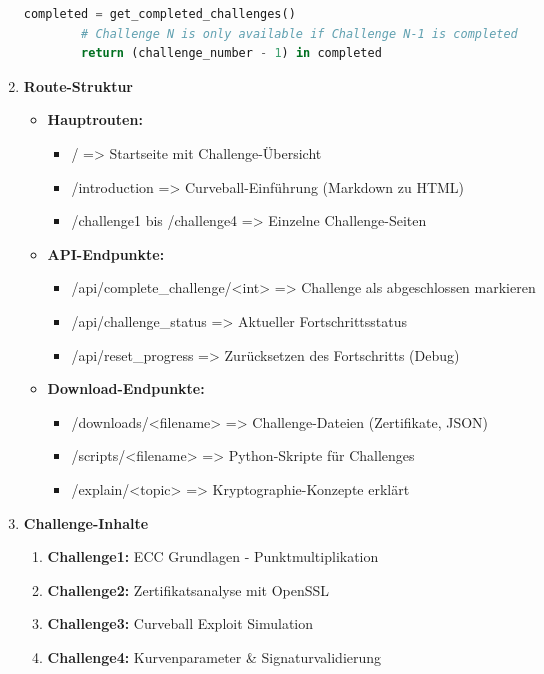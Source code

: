 \documentclass{article}
\begin{document}
\begin{enumerate}
\begin{lstlisting}[language=Python,caption={Challenge-Lock}]
        completed = get_completed_challenges()
        # Challenge N is only available if Challenge N-1 is completed
        return (challenge_number - 1) in completed
    \end{lstlisting}
    \item \textbf{Route-Struktur}
    \begin{itemize}
        \item \textbf{Hauptrouten:}
        \begin{itemize}
            \item / => Startseite mit Challenge-Übersicht
            \item /introduction => Curveball-Einführung (Markdown zu HTML)
            \item /challenge1 bis /challenge4 => Einzelne Challenge-Seiten
        \end{itemize}
        \item \textbf{API-Endpunkte:}
        \begin{itemize}
            \item /api/complete\_challenge/<int> => Challenge als abgeschlossen markieren
            \item /api/challenge\_status => Aktueller Fortschrittsstatus
            \item /api/reset\_progress => Zurücksetzen des Fortschritts (Debug)
        \end{itemize}
        \item \textbf{Download-Endpunkte:}
        \begin{itemize}
            \item /downloads/<filename> => Challenge-Dateien (Zertifikate, JSON)
            \item /scripts/<filename> => Python-Skripte für Challenges
            \item /explain/<topic> => Kryptographie-Konzepte erklärt
        \end{itemize}
    \end{itemize}
    \item \textbf{Challenge-Inhalte}
    \begin{enumerate}
        \item \textbf{Challenge1:} ECC Grundlagen - Punktmultiplikation
        \item \textbf{Challenge2:} Zertifikatsanalyse mit OpenSSL
        \item \textbf{Challenge3:} Curveball Exploit Simulation
        \item \textbf{Challenge4:} Kurvenparameter \& Signaturvalidierung
    \end{enumerate}
\end{enumerate}
\end{document}
